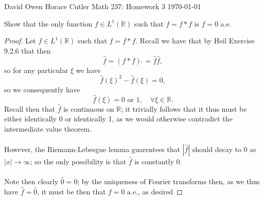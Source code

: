 \documentclass[12pt]{article}
\newenvironment{ex}[2][Exercise]{\begin{trivlist}
\item[\hskip \labelsep {\bfseries #1}\hskip \labelsep {\bfseries #2.}]}{\end{trivlist}}
\begin{document}
\noindent David Owen Horace Cutler \hfill {\Large Math 237: Homework 3} \hfill \today

\begin{ex}{1}
    Show that the only function $f \in L^1(\mathbb{R})$ such that $f = f * f$ is $f = 0$ a.e. 
    \begin{proof}
        Let $f \in L^1(\mathbb{R})$ such that $f = f * f$. Recall we have that by Heil Exercise 9.2.6 that then 
        $$\hat{f} = (f * f)\hat{\;} = \hat{f}\hat{f},$$
        so for any particular $\xi$ we have 
        $$\hat{f}(\xi)^2 - \hat{f}(\xi) = 0,$$
        so we consequently have 
        $$\hat{f}(\xi) = 0 \text{ or } 1, \quad \forall \xi \in \mathbb{R}.$$
        Recall then that $\hat{f}$ is continuous on $\mathbb{R}$; it trivially follows that it thus must be either identically 0 or identically 1, as we would otherwise contradict the intermediate value theorem. \\ \\
        However, the Riemann-Lebesgue lemma guarentees that $|\hat{f}|$ should decay to $0$ as $|x| \rightarrow \infty$; so the only possibility is that $\hat{f}$ is constantly 0. \\ \\
        Note then clearly $\hat{0} = 0$; by the uniqueness of Fourier transforms then, as we thus have $\hat{f} = \hat{0}$, it must be then that $f = 0 \text{ a.e.}$, as desired
    \end{proof}
\end{ex}
\end{document}
